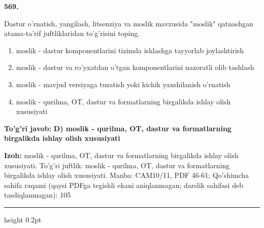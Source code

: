 \documentclass[10pt,a4paper]{article}
\begin{document}
{\bfseries\sffamily\color{ink} 569.}
\par
Dastur o'rnatish, yangilash, litsenziya va moslik mavzusida "moslik" qatnashgan atama-ta'rif juftliklaridan to'g'risini toping.
\begin{enumerate}[label=\Alph*),leftmargin=9mm]
\item moslik - dastur komponentlarini tizimda ishlashga tayyorlab joylashtirish
\item moslik - dastur va ro'yxatdan o'tgan komponentlarini nazoratli olib tashlash
\item moslik - mavjud versiyaga tuzatish yoki kichik yaxshilanish o'rnatish
\item moslik - qurilma, OT, dastur va formatlarning birgalikda ishlay olish xususiyati
\end{enumerate}
\begin{tcolorbox}[enhanced,breakable,colback=teal!4,colframe=teal!60!black,boxrule=0.45pt,arc=1.2mm,left=2.7mm,right=2.7mm,top=1.8mm,bottom=1.8mm,before skip=2mm,after skip=2mm]
{\bfseries\sffamily\color{teal}To'g'ri javob:} \textbf{D) moslik - qurilma, OT, dastur va formatlarning birgalikda ishlay olish xususiyati}
\par\smallskip
{\bfseries Izoh:} moslik - qurilma, OT, dastur va formatlarning birgalikda ishlay olish xususiyati. To'g'ri juftlik: moslik - qurilma, OT, dastur va formatlarning birgalikda ishlay olish xususiyati. Manba: CAM10/11, PDF 46-61; Qo'shimcha sahifa raqami (qaysi PDFga tegishli ekani aniqlanmagan; darslik sahifasi deb tasdiqlanmagan): 105
\end{tcolorbox}
\vspace{2mm}\hrule height 0.2pt\vspace{3mm}
\end{document}

